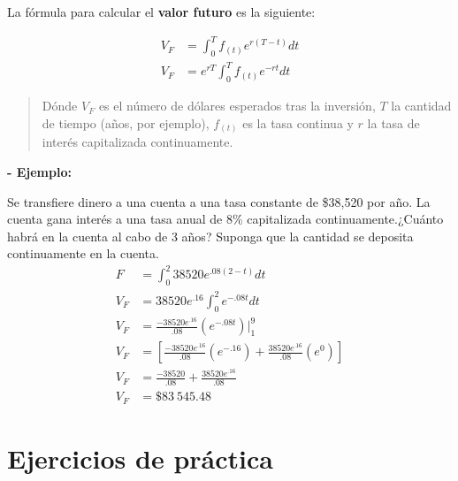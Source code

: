 \documentclass{article}
\begin{document}
                    La fórmula para calcular el \textbf{valor futuro} es la siguiente:

                    \begin{equation}
                    \begin{split}
                        V_F &=\int_{0}^{T} f_{(t)} e^{r(T-t)} d t \\
                        V_F &= e^{r T} \int_{0}^{T} f_{(t)} e^{-r t} d t
                    \end{split}
                    \end{equation}

                    \begin{quote}
                        Dónde $V_F$ es el número de dólares esperados tras la inversión, $T$ la cantidad de tiempo (años, por ejemplo), $f_{(t)}$ es la tasa continua y $r$ la tasa de interés capitalizada continuamente.
                    \end{quote}

                    \textbf{- Ejemplo:}

                    Se transfiere dinero a una cuenta a una tasa constante de \$38,520 por año. La cuenta gana interés a una tasa anual de 8\% capitalizada continuamente.¿Cuánto habrá en la cuenta al cabo de 3 años? Suponga que la cantidad se deposita continuamente en la cuenta.
                    \begin{equation*}
                    \begin{split}
                        F &= \int_{0}^{2} 38520e^{.08(2-t)} dt \\
                        V_F &= 38520e^{.16}\int_{0}^{2}e^{-.08t} dt \\
                        V_F &= \frac{-38520e^{.16}}{.08}(e^{-.08t})\Biggr|_{1}^{9} \\
                        V_F &= \left[ \frac{-38520e^{.16}}{.08}(e^{-.16})+\frac{38520e^{.16}}{.08}(e^{0})\right] \\
                        V_F &= \frac{-38520}{.08}+\frac{38520e^{.16}}{.08}\\
                        V_F &=\$83\ 545.48
                    \end{split}
                    \end{equation*}
                    
        \section{Ejercicios de práctica}
\end{document}

